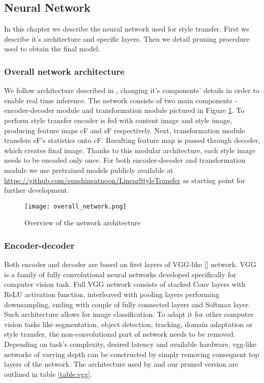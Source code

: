 \documentclass[../Main.tex]{subfiles}
\begin{document}
    
\subsection{Neural Network}
    In this chapter we describe the neural network used for style transfer. 
    First we describe it's architecture and specific layers. Then we detail
    pruning procedure used to obtain the final model.
    \subsubsection{Overall network architecture} 
    We follow architecture described in \cite{Li2018}, changing it's components' details 
    in order to enable real time inference. The network consists of two 
    main components - encoder-decoder module and
    transformation module pictured in Figure \ref{fig:overall_network}.
    To perform style transfer encoder is fed with content image
    and style image, producing feature maps cF and sF respectively.
    Next, transformation module transfers sF's statistics onto cF. Resulting 
    feature map is passed through decoder, which creates final image. 
    Thanks to this modular architecture, each style image needs to be encoded
    only once. For both encoder-decoder and
    transformation module we use pretrained models publicly available at 
    \url{https://github.com/sunshineatnoon/LinearStyleTransfer}
    as starting point for further development. 
    
    \begin{figure}[h!]
        \texttt{[image: overall\_network.png]}
        \caption{Overview of the network architecture}
        \label{fig:overall_network}
    \end{figure}
    
    
    \subsubsection{Encoder-decoder}
    Both encoder and decoder are based on first layers of VGG-like [\cite{vgg}]
    network. VGG is a family of fully convolutional neural networks developed 
    specifically for computer vision task. Full VGG network consists of
    stacked Conv layers with ReLU activation function, interleaved with pooling
    layers performing downsampling, ending with couple of fully
    connected layers and Softmax layer. Such architecture allows for image classification.
    To adapt it for other computer vision tasks like segmentation, object detection,
    tracking, domain adaptation or style transfer, the non-convolutional part
    of network needs to be removed. Depending on task's complexity, desired
    latency and available hardware, vgg-like networks of varying depth can be 
    constructed by simply removing consequent top layers of the network.
    The architecture used by \cite{Li2018} and our pruned version are 
    outlined in table \ref{table:vgg}. 
    
\end{document}
